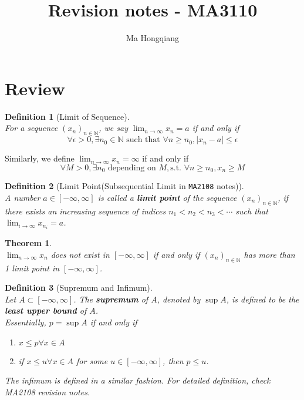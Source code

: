 \documentclass[12pt]{article}
\newtheorem{definition}{Definition}[section]
\newtheorem{theorem}{Theorem}[section]
\theoremstyle{definition}
\begin{document}
\title{Revision notes - MA3110}
\author{Ma Hongqiang}
\maketitle
\tableofcontents

\clearpage
\section{Review}
\begin{definition}[Limit of Sequence]
\hfill\\\normalfont For a sequence $(x_n)_{n\in \mathbb{N}}$, we say $\lim_{n\to \infty} x_n = a$ if and only if
\[
\forall \epsilon >0, \exists n_0\in \mathbb{N} \text{ such that }\forall n\geq n_0, |x_n-a|\leq \epsilon
\]
\end{definition}
Similarly, we define $\lim_{n\to \infty} x_n = \infty$ if and only if
\[
\forall M>0, \exists n_0\text{ depending on }M, \text{s.t. }\forall n\geq n_0, x_n\geq M
\]
\begin{definition}[Limit Point(Subsequential Limit in \texttt{MA2108} notes)]
\hfill\\\normalfont A number $a\in[-\infty, \infty]$ is called a \textbf{limit point} of the sequence $(x_n)_{n\in \mathbb{N}}$, if there exists an increasing sequence of indices $n_1<n_2<n_3<\cdots$ such that $\lim_{i\to \infty} x_{n_i} = a$.
\end{definition}
\begin{theorem}
\hfill\\\normalfont $\lim_{n\to \infty}x_n$ does not exist in $[-\infty, \infty]$ if and only if $(x_n)_{n\in \mathbb{N}}$ has more than 1 limit point in $[-\infty, \infty]$.
\end{theorem}
\begin{definition}[Supremum and Infimum]
\hfill\\\normalfont Let $A\subset[-\infty, \infty]$. The \textbf{supremum} of $A$, denoted by $\sup A$, is defined to be the \textbf{least upper bound} of $A$.\\
Essentially, $p = \sup A$ if and only if
\begin{enumerate}
  \item $x\leq p\forall x\in A$
  \item if $x\leq u\forall x\in A$ for some $u\in [-\infty, \infty]$, then $p\leq u$.
\end{enumerate}
The infimum is defined in a similar fashion. For detailed definition, check MA2108 revision notes.
\end{definition}
\end{document}
